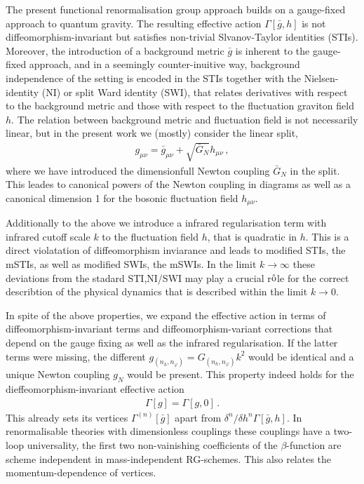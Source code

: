 \documentclass[11pt]{book} %
\begin{document}
The present functional renormalisation group approach builds on a
gauge-fixed approach to quantum gravity. The resulting effective
action $\Gamma[\bar g,h]$ is not diffeomorphism-invariant but
satisfies non-trivial Slvanov-Taylor identities (STIs). Moreover, the
introduction of a background metric $\bar g$ is inherent to the
gauge-fixed approach, and in a seemingly counter-inuitive way,
background independence of the setting is encoded in the STIs together
with the Nielsen-identity (NI) or split Ward identity (SWI), that
relates derivatives with respect to the background metric and those
with respect to the fluctuation graviton field $h$. The relation
between background metric and fluctuation field is not necessarily
linear, but in the present work we (mostly) consider the linear split,
\begin{align}\label{eq:linpara}
  g_{\mu \nu}=\bar g_{\mu \nu}+ \sqrt{\bar{G}_N} h_{\mu \nu}\,,
\end{align}
where we have introduced the dimensionfull Newton coupling $\bar{G}_N$ in the split. This
leades to canonical powers of the Newton coupling in diagrams as well
as a canonical dimension 1 for the bosonic fluctuation field $h_{\mu \nu}$.

Additionally to the above we introduce a infrared regularisation term
with infrared cutoff scale $k$ to the fluctuation field $h$, that is
quadratic in $h$. This is a direct violatation of diffeomorphism
inviarance and leads to modified STIs, the mSTIs, as well as modified
SWIs, the mSWIs. In the limit $k\to\infty$ these deviations from the
stadard STI,NI/SWI may play a crucial r$\hat{\rm o}$le for the correct
describtion of the physical dynamics that is described within the
limit $k\to 0$.

In spite of the above properties, we expand the effective action in
terms of diffeomorphism-invariant terms and diffeomorphism-variant
corrections that depend on the gauge fixing as well as the infrared
regularisation. If the latter terms were missing, the different
$g_{(n_h,n_\varphi)}=G_{(n_h,n_\varphi)} k^2$ would be identical and a
unique Newton coupling $g_N$ would be present. This property indeed
holds for the dieffeomorphism-invariant effective action
\begin{align}
\Gamma[g]= \Gamma[g,0]\,.
\end{align}
This already sets its vertices $\Gamma^{(n)}[\bar g]$ apart from
$\delta^n/\delta h^n \Gamma[\bar g,h]$. In renormalisable theories with
dimensionless couplings these couplings have a two-loop universality,
the first two non-vainishing coefficients of the $\beta$-function are
scheme independent in mass-independent RG-schemes. This also relates
the momentum-dependence of vertices.
\end{document}

